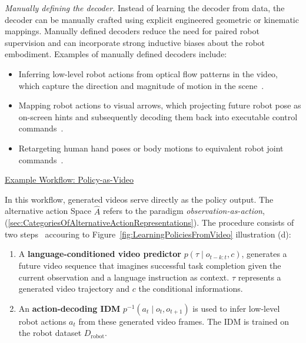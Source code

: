 \textit{Manually defining the decoder.}
Instead of learning the decoder from data, the decoder can be manually crafted using explicit engineered geometric or kinematic mappings. 
Manually defined decoders reduce the need for paired robot supervision and can incorporate strong inductive biases about the robot embodiment. 
Examples of manually defined decoders include:
\begin{itemize}
    \item Inferring low-level robot actions from optical flow patterns in the video, which capture the direction and magnitude of motion in the scene~\cite{Ko2023LearningTA, Yuan2024GeneralFA}.
    \item Mapping robot actions to visual arrows, which projecting future robot pose as on-screen hints and subsequently decoding them back into executable control commands~\cite{Nasiriany2024PIVOTIV}.
    \item Retargeting human hand poses or body motions to equivalent robot joint commands~\cite{Qin2021DexMVIL, Sivakumar2022RoboticTL}.
\end{itemize}



\underline{Example Workflow: Policy-as-Video}

In this workflow, generated videos serve directly as the policy output. The alternative action Space $\hat{A}$ refers to the paradigm \textit{observation-as-action}, (\autoref{sec:CategoriesOfAlternativeActionRepresentations}). The procedure consists of two steps~\cite{Du2023LearningUP, McCarthy_2025} accouring to Figure~\ref{fig:LearningPoliciesFromVideo} illustration (d):
\begin{enumerate}
    \item A \textbf{language-conditioned video predictor} $p(\tau \mid o_{t-k:t}, c)$, generates a future video sequence that imagines successful task completion given the current observation and a language instruction as context. $\tau$ represents a generated video trajectory and $c$ the conditional informations.
    
    \item An \textbf{action-decoding \acf{IDM}} $p^{-1}(a_t \mid o_t, o_{t+1})$ is used to infer low-level robot actions $a_t$ from these generated video frames. The IDM is trained on the robot dataset $D_{\text{robot}}$.
\end{enumerate}


